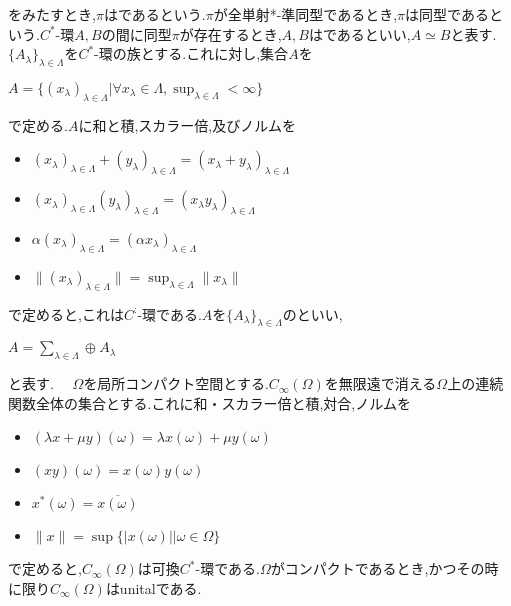をみたすとき,$\pi$はであるという.$\pi $が全単射*-準同型であるとき,$\pi$は同型であるという.$C^*$-環$A,B$の間に同型$\pi$が存在するとき,$A,B$はであるといい,$A\simeq B$と表す.
$\{A_{\lambda}\}_{\lambda \in \Lambda}$を$C^*$-環の族とする.これに対し,集合$A$を
\begin{center}
$A=\{ \left( x_{\lambda}\right)_{\lambda \in \Lambda}|\forall x_{\lambda}\in \Lambda ,
\sup_{\lambda \in \Lambda}<\infty \}$
\end{center}
で定める.$A$に和と積,スカラー倍,及びノルムを
\begin{itemize}
\item $\left( x_{\lambda}\right)_{\lambda \in \Lambda}+\left( y_{\lambda}\right)_{\lambda \in \Lambda}
=\left( x_{\lambda}+y_{\lambda}\right)_{\lambda \in \Lambda}$
\item $\left( x_{\lambda}\right)_{\lambda \in \Lambda}\left( y_{\lambda}\right)_{\lambda \in \Lambda}
=\left( x_{\lambda}y_{\lambda}\right)_{\lambda \in \Lambda}$
\item $\alpha \left( x_{\lambda}\right)_{\lambda \in \Lambda}=\left( \alpha x_{\lambda}\right)_{\lambda \in \Lambda}$
\item $\parallel \left( x_{\lambda}\right)_{\lambda \in \Lambda}\parallel=\sup_{\lambda \in \Lambda}\parallel x_{\lambda}\parallel$
\end{itemize}
で定めると,これは$C^:$-環である.$A$を$\{A_{\lambda}\}_{\lambda \in \Lambda}$のといい,
\begin{center}
$A=\sum_{\lambda \in \Lambda} \oplus A_{\lambda}$
\end{center}
と表す.
　$\Omega$を局所コンパクト空間とする.$C_{\infty}\left( \Omega\right)$を無限遠で消える$\Omega$上の連続関数全体の集合とする.これに和・スカラー倍と積,対合,ノルムを
\begin{itemize}
\item $\left(\lambda x+\mu y\right)\left(\omega\right)=\lambda x\left(\omega\right)+\mu y\left(\omega\right)$
\item $\left(xy\right)\left(\omega\right)=x\left(\omega\right)y\left(\omega\right)$
\item $x^*\left(\omega\right)=\overline{x\left(\omega\right)}$
\item $\parallel x\parallel=\sup\{|x\left(\omega\right)||\omega \in \Omega\}$
\end{itemize}
で定めると,$C_{\infty}\left( \Omega\right)$は可換$C^*$-環である.$\Omega$がコンパクトであるとき,かつその時に限り$C_{\infty}\left( \Omega\right)$はunitalである.\\
